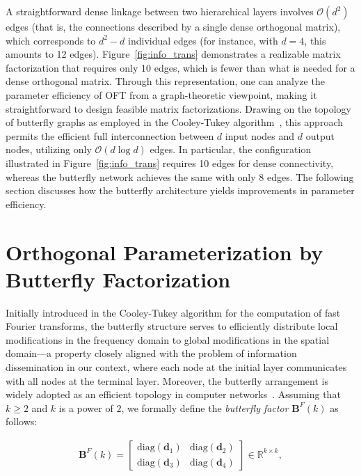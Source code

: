 A straightforward dense linkage between two hierarchical layers involves $\mathcal{O}(d^2)$ edges (that is, the connections described by a single dense orthogonal matrix), which corresponds to $d^2 - d$ individual edges (for instance, with $d=4$, this amounts to 12 edges). Figure~\ref{fig:info_trans} demonstrates a realizable matrix factorization that requires only 10 edges, which is fewer than what is needed for a dense orthogonal matrix. Through this representation, one can analyze the parameter efficiency of OFT from a graph-theoretic viewpoint, making it straightforward to design feasible matrix factorizations. Drawing on the topology of butterfly graphs as employed in the Cooley-Tukey algorithm~\cite{cooley1965algorithm}, this approach permits the efficient full interconnection between $d$ input nodes and $d$ output nodes, utilizing only $\mathcal{O}(d\log d)$ edges. In particular, the configuration illustrated in Figure~\ref{fig:info_trans} requires 10 edges for dense connectivity, whereas the butterfly network achieves the same with only 8 edges. The following section discusses how the butterfly architecture yields improvements in parameter efficiency.

\section{Orthogonal Parameterization by Butterfly Factorization}

Initially introduced in the Cooley-Tukey algorithm for the computation of fast Fourier transforms, the butterfly structure serves to efficiently distribute local modifications in the frequency domain to global modifications in the spatial domain—a property closely aligned with the problem of information dissemination in our context, where each node at the initial layer communicates with all nodes at the terminal layer. Moreover, the butterfly arrangement is widely adopted as an efficient topology in computer networks~\cite{solihin2015fundamentals,li2011linear}. Assuming that $k\geq 2$ and $k$ is a power of $2$, we formally define the \emph{butterfly factor} $\bm{B}^F(k)$ as follows:

\begin{equation}\label{eq:but_factor}
\begin{aligned}
    \bm{B}^F(k)=\begin{bmatrix}
    \text{diag}(\bm{d}_1) & \text{diag}(\bm{d}_2) \\
    \text{diag}(\bm{d}_3) & \text{diag}(\bm{d}_4)
    \end{bmatrix}\in\mathbb{R}^{k\times k},
\end{aligned}
\end{equation}

